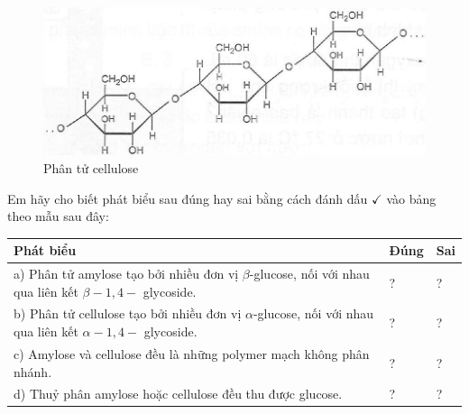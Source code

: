 \documentclass[10pt]{article}
\begin{document}
\begin{figure}[h]
\begin{center}
  \includegraphics[width=\textwidth]{2025_10_23_de6f5713836e4e91b3c8g-043(1)}
\captionsetup{labelformat=empty}
\caption{Phân tử cellulose}
\end{center}
\end{figure}

Em hãy cho biết phát biểu sau đúng hay sai bằng cách đánh dấu $\checkmark$ vào bảng theo mẫu sau đây:

\begin{center}
\begin{tabular}{|l|l|l|}
\hline
Phát biểu & Đúng & Sai \\
\hline
a) Phân tử amylose tạo bởi nhiều đơn vị $\beta$-glucose, nối với nhau qua liên kết $\beta-1,4-$ glycoside. & ? & ? \\
\hline
b) Phân tử cellulose tạo bởi nhiều đơn vị $\alpha$-glucose, nối với nhau qua liên kết $\alpha-1,4-$ glycoside. & ? & ? \\
\hline
c) Amylose và cellulose đều là những polymer mạch không phân nhánh. & ? & ? \\
\hline
d) Thuỷ phân amylose hoặc cellulose đều thu được glucose. & ? & ? \\
\hline
\end{tabular}
\end{center}
\end{document}
